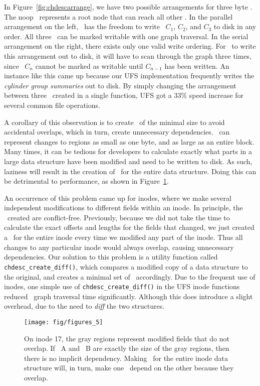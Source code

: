 In Figure~\ref{fig:chdescarrange}, we have two possible arrangements for three
byte \chdescs. The noop \chdesc\ represents a root node that can reach all
other \chdescs. In the parallel arrangement on the left, \Kudos\ has the
freedom to write \chdescs\ $C_1$, $C_2$, and $C_3$ to disk in any order. All
three \chdescs\ can be marked writable with one graph traversal. In the serial
arrangement on the right, there exists only one valid write ordering. For
\Kudos\ to write this arrangement out to disk, it will have to scan through
the graph three times, since \chdesc\ $C_n$ cannot be marked as writable until
$C_{n-1}$ has been written.
An instance like this came up because our UFS implementation frequently writes
the \emph{cylinder group summaries} out to disk. By simply changing the
arrangement between three \chdescs\ created in a single function, UFS got a
33\% speed increase for several common file operations.

A corollary of this observation is to create \chdescs\ of the minimal size to
avoid accidental overlaps, which in turn, create unnecessary dependencies.
\Chdescs\ can represent changes to regions as small as one byte, and as large
as an entire block. Many times, it can be tedious for developers to calculate
exactly what parts in a large data structure have been modified and need to be
written to disk. As such, laziness will result in the creation of \chdescs\
for the entire data structure. Doing this can be detrimental to performance,
as shown in Figure~\ref{fig:overlap}.

An occurrence of this problem came up for inodes, where we make several
independent modifications to different fields within an inode. In principle,
the \chdescs\ created are conflict-free. Previously, because we did not take
the time to calculate the exact offsets and lengths for the fields that
changed, we just created a \chdesc\ for the entire inode every time we modified
any part of the inode. Thus all changes to any particular inode would always
overlap, causing unnecessary dependencies. Our solution to this problem is a
utility function called \texttt{chdesc\_create\_diff()}, which compares a
modified copy of a data structure to the original, and creates a minimal set of
\chdescs\ accordingly. Due to the frequent use of inodes, one simple use of
\texttt{chdesc\_create\_diff()} in the UFS inode functions reduced \chdesc\
graph traversal time significantly. Although this does introduce a slight
overhead, due to the need to \emph{diff} the two structures.

\begin{figure}[htb]
  \centering
  \texttt{[image: fig/figures\_5]}
  \caption{\label{fig:overlap} On inode 17, the gray regions represent
  modified fields that do not overlap. If \chdesc\ A and \chdesc\ B are
  exactly the size of the gray regions, then there is no implicit dependency.
  Making \chdescs\ for the entire inode data structure will, in turn, make
  one \chdesc\ depend on the other because they overlap.}
\end{figure}

